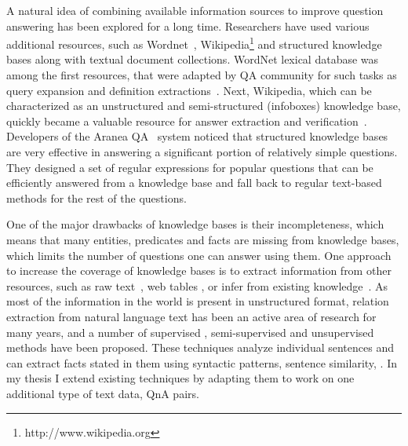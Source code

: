 A natural idea of combining available information sources to improve question answering has been explored for a long time.
Researchers have used various additional resources, such as Wordnet~\cite{miller1995wordnet}, Wikipedia\footnote{http://www.wikipedia.org} and structured knowledge bases along with textual document collections.
WordNet lexical database was among the first resources, that were adapted by QA community for such tasks as query expansion and definition extractions~\cite{hovy2001use,pasca2001informative}.
Next, Wikipedia, which can be characterized as an unstructured and semi-structured (infoboxes) knowledge base, quickly became a valuable resource for answer extraction and verification~\cite{ahn2005using,buscaldi2006mining}.
Developers of the Aranea QA~\cite{lin2003question} system noticed that structured knowledge bases are very effective in answering a significant portion of relatively simple questions.
They designed a set of regular expressions for popular questions that can be efficiently answered from a knowledge base and fall back to regular text-based methods for the rest of the questions.

One of the major drawbacks of knowledge bases is their incompleteness, which means that many entities, predicates and facts are missing from knowledge bases, which limits the number of questions one can answer using them.
One approach to increase the coverage of knowledge bases is to extract information from other resources, such as raw text~\cite{MintzBSJ09,jijkoun2004information,Gupta:2014:BOS:2732286.2732288}, web tables \cite{Cafarella:2008:WEP:1453856.1453916}, or infer from existing knowledge~\cite{lao2012reading,gardner2015efficient,bordes2011learning}.
As most of the information in the world is present in unstructured format, relation extraction from natural language text has been an active area of research for many years, and a number of supervised \cite{snow2004learning}, semi-supervised \cite{Agichtein:2000:SER:336597.336644} and unsupervised \cite{Fader:2011:IRO:2145432.2145596} methods have been proposed.
These techniques analyze individual sentences and can extract facts stated in them using syntactic patterns, sentence similarity, \etc.
In my thesis I extend existing techniques by adapting them to work on one additional type of text data, \ie QnA pairs.

